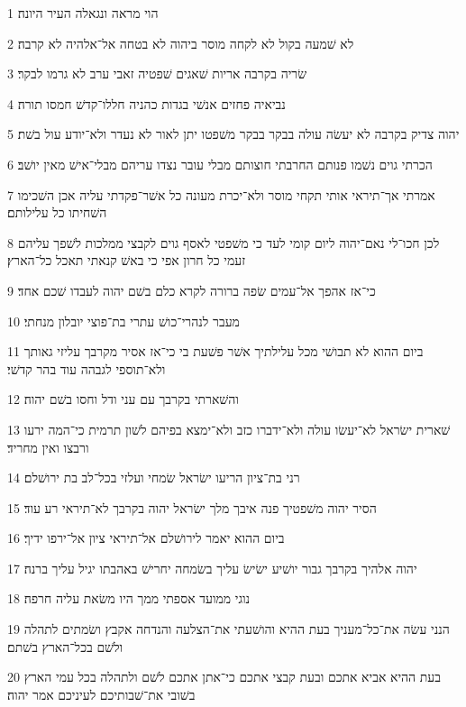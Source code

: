 \par 1 הוי מראה ונגאלה העיר היונה׃
\par 2 לא שׁמעה בקול לא לקחה מוסר ביהוה לא בטחה אל־אלהיה לא קרבה׃
\par 3 שׂריה בקרבה אריות שׁאגים שׁפטיה זאבי ערב לא גרמו לבקר׃
\par 4 נביאיה פחזים אנשׁי בגדות כהניה חללו־קדשׁ חמסו תורה׃
\par 5 יהוה צדיק בקרבה לא יעשׂה עולה בבקר בבקר משׁפטו יתן לאור לא נעדר ולא־יודע עול בשׁת׃
\par 6 הכרתי גוים נשׁמו פנותם החרבתי חוצותם מבלי עובר נצדו עריהם מבלי־אישׁ מאין יושׁב׃
\par 7 אמרתי אך־תיראי אותי תקחי מוסר ולא־יכרת מעונה כל אשׁר־פקדתי עליה אכן השׁכימו השׁחיתו כל עלילותם׃
\par 8 לכן חכו־לי נאם־יהוה ליום קומי לעד כי משׁפטי לאסף גוים לקבצי ממלכות לשׁפך עליהם זעמי כל חרון אפי כי באשׁ קנאתי תאכל כל־הארץ׃
\par 9 כי־אז אהפך אל־עמים שׂפה ברורה לקרא כלם בשׁם יהוה לעבדו שׁכם אחד׃
\par 10 מעבר לנהרי־כושׁ עתרי בת־פוצי יובלון מנחתי׃
\par 11 ביום ההוא לא תבושׁי מכל עלילתיך אשׁר פשׁעת בי כי־אז אסיר מקרבך עליזי גאותך ולא־תוספי לגבהה עוד בהר קדשׁי׃
\par 12 והשׁארתי בקרבך עם עני ודל וחסו בשׁם יהוה׃
\par 13 שׁארית ישׂראל לא־יעשׂו עולה ולא־ידברו כזב ולא־ימצא בפיהם לשׁון תרמית כי־המה ירעו ורבצו ואין מחריד׃
\par 14 רני בת־ציון הריעו ישׂראל שׂמחי ועלזי בכל־לב בת ירושׁלם׃
\par 15 הסיר יהוה משׁפטיך פנה איבך מלך ישׂראל יהוה בקרבך לא־תיראי רע עוד׃
\par 16 ביום ההוא יאמר לירושׁלם אל־תיראי ציון אל־ירפו ידיך׃
\par 17 יהוה אלהיך בקרבך גבור יושׁיע ישׂישׂ עליך בשׂמחה יחרישׁ באהבתו יגיל עליך ברנה׃
\par 18 נוגי ממועד אספתי ממך היו משׂאת עליה חרפה׃
\par 19 הנני עשׂה את־כל־מעניך בעת ההיא והושׁעתי את־הצלעה והנדחה אקבץ ושׂמתים לתהלה ולשׁם בכל־הארץ בשׁתם׃
\par 20 בעת ההיא אביא אתכם ובעת קבצי אתכם כי־אתן אתכם לשׁם ולתהלה בכל עמי הארץ בשׁובי את־שׁבותיכם לעיניכם אמר יהוה׃


